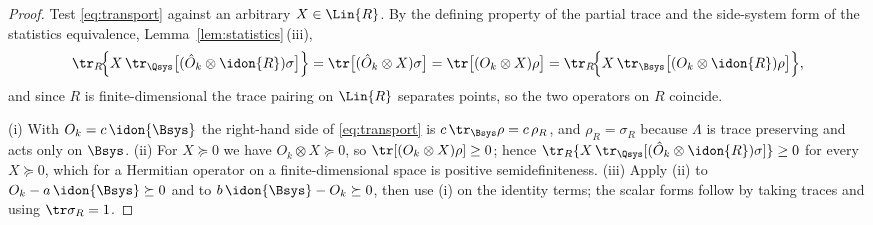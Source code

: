 \begin{proof}
Test \eqref{eq:transport} against an arbitrary $X\in\Lin{R}$. By the defining
property of the partial trace and the side-system form of the statistics
equivalence, Lemma~\ref{lem:statistics}\,(iii),
\begin{equation*}
  \tr_R\!\Big\{X\,\tr_{\Qsys}\big[(\hat O_k\otimes\idon{R})\sigma\big]\Big\}
  =\tr\big[(\hat O_k\otimes X)\sigma\big]
  =\tr\big[(O_k\otimes X)\rho\big]
  =\tr_R\!\Big\{X\,\tr_{\Bsys}\big[(O_k\otimes\idon{R})\rho\big]\Big\},
\end{equation*}
and since $R$ is finite-dimensional the trace pairing on $\Lin{R}$ separates
points, so the two operators on $R$ coincide.

(i) With $O_k=c\,\idon{\Bsys}$ the right-hand side of \eqref{eq:transport} is
$c\,\tr_{\Bsys}\rho=c\,\rho_R$, and $\rho_R=\sigma_R$ because $\Lambda$ is
trace preserving and acts only on $\Bsys$. (ii) For $X\succeq0$ we have
$O_k\otimes X\succeq0$, so $\tr[(O_k\otimes X)\rho]\ge0$; hence
$\tr_R\{X\,\tr_{\Qsys}[(\hat O_k\otimes\idon{R})\sigma]\}\ge0$ for every
$X\succeq0$, which for a Hermitian operator on a finite-dimensional space is
positive semidefiniteness. (iii) Apply (ii) to $O_k-a\,\idon{\Bsys}\succeq0$
and to $b\,\idon{\Bsys}-O_k\succeq0$, then use (i) on the identity terms; the
scalar forms follow by taking traces and using $\tr\sigma_R=1$.
\end{proof}

